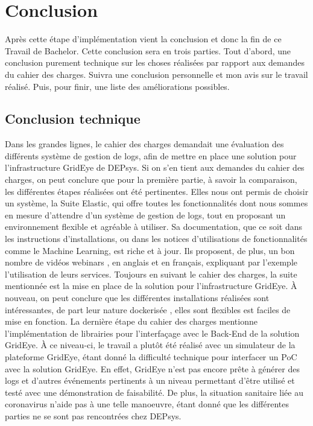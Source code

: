 \documentclass[paper=a4, fontsize=11pt]{scrartcl}
\begin{document}
\newpage

\section{Conclusion}

Après cette étape d'implémentation vient la conclusion et donc la fin de ce Travail de Bachelor. Cette conclusion sera en trois parties. Tout d'abord, une conclusion purement technique sur les choses réalisées par rapport aux demandes du cahier des charges. Suivra une conclusion personnelle et mon avis sur le travail réalisé. Puis, pour finir, une liste des améliorations possibles.

\subsection{Conclusion technique}
Dans les grandes lignes, le cahier des charges demandait une évaluation des différents système de gestion de logs, afin de mettre en place une solution pour l'infrastructure GridEye de DEPsys.
Si on s'en tient aux demandes du cahier des charges, on peut conclure que pour la première partie, à savoir la comparaison, les différentes étapes réalisées ont été pertinentes. Elles nous ont permis de choisir un système, la Suite Elastic, qui offre toutes les fonctionnalités dont nous sommes en mesure d'attendre d'un système de gestion de logs, tout en proposant un environnement flexible et agréable à utiliser. Sa documentation, que ce soit dans les instructions d'installations, ou dans les notices d'utilisations de fonctionnalités comme le Machine Learning, est riche et à jour. Ils proposent, de plus, un bon nombre de vidéos \og webinars \fg, en anglais et en français, expliquant par l'exemple l'utilisation de leurs services. \newline
Toujours en suivant le cahier des charges, la suite mentionnée est la mise en place de la solution pour l'infrastructure GridEye. À nouveau, on peut conclure que les différentes installations réalisées sont intéressantes, de part leur nature \og dockerisée \fg, elles sont flexibles est faciles de mise en fonction. \newline
La dernière étape du cahier des charges mentionne l'implémentation de librairies pour l'interfaçage avec le Back-End de la solution GridEye. À ce niveau-ci, le travail a plutôt été réalisé avec un simulateur de la plateforme GridEye, étant donné la difficulté technique pour interfacer un PoC avec la solution GridEye. En effet, GridEye n'est pas encore prête à générer des logs et d'autres événements pertinents à un niveau permettant d'être utilisé et testé avec une démonstration de faisabilité. De plus, la situation sanitaire liée au coronavirus n'aide pas à une telle manoeuvre, étant donné que les différentes parties ne se sont pas rencontrées chez DEPsys. \newline
\end{document}
